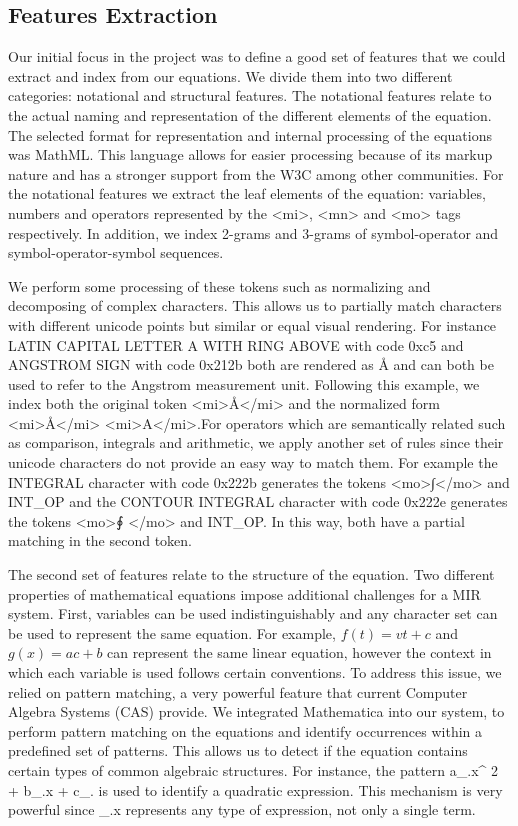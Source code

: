 \documentclass{sig-alternate}
\begin{document}
\subsection{Features Extraction}
Our initial focus in the project was to define a good set of features that we could extract and index from our equations. We divide them into two different categories: notational and structural features. The notational features relate to the actual naming and representation of the different elements of the equation. The selected format for representation and internal processing of the equations was MathML. This language allows for easier processing because of its markup nature and has a stronger support from the W3C among other communities. For the notational features we extract the leaf elements of the equation: variables, numbers and operators represented by the <mi>, <mn> and <mo> tags respectively. In addition, we index 2-grams and 3-grams of symbol-operator and symbol-operator-symbol sequences.

We perform some processing of these tokens such as normalizing and decomposing of complex characters. This allows us to partially match characters with different unicode points but similar or equal visual rendering. For instance LATIN CAPITAL LETTER A WITH RING ABOVE with code 0xc5 and ANGSTROM SIGN with code 0x212b both are rendered as \r{A} and can both be used to refer to the Angstrom measurement unit. Following this example, we index both the original token <mi>\r{A}</mi> and the normalized form <mi>\r{A}</mi> <mi>A</mi>.For operators which are semantically related such as comparison, integrals and arithmetic, we apply another set of rules since their unicode characters do not provide an easy way to match them.
For example the INTEGRAL character with code 0x222b generates the tokens <mo>{\unicodefont ∫}</mo> and INT\_OP and the CONTOUR INTEGRAL character with code 0x222e generates the tokens <mo>{\unicodefont ∮} </mo> and INT\_OP. In this way, both have a partial matching in the second token.

The second set of features relate to the structure of the equation. Two different properties of mathematical equations impose additional challenges for a MIR system. First, variables can be used indistinguishably and any character set can be used to represent the same equation. For example, $f(t) = vt + c $ and $g(x) = ac + b$ can represent the same linear equation, however the context in which each variable is used follows certain conventions. To address this issue, we relied on pattern matching, a very powerful feature that current Computer Algebra Systems (CAS) provide. We integrated Mathematica\cite{mathematica} into our system, to perform pattern matching on the equations and identify occurrences within a predefined set of patterns. This allows us to detect if the equation contains certain types of common algebraic structures. For instance, the pattern {\codefont a\_.x\^{} 2 + b\_.x + c\_.} is used to identify a quadratic expression. This mechanism is very powerful since \_.x represents any type of expression, not only a single term.
\end{document}
